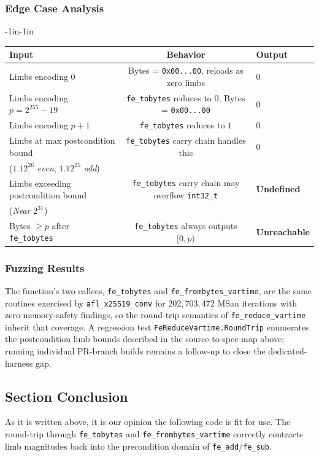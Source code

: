 \documentclass[12pt,titlepage,table]{article}
\begin{document}
\subsubsection{Edge Case Analysis}
\begin{table}[htbp]
\begin{adjustwidth}{-1in}{-1in}
\centering
{
\begin{tabular}{| l | c | l|}
\hline
\textbf{Input} & \textbf{Behavior} & \textbf{Output} \\
\hline
\hline
Limbs encoding $0$ & Bytes = \verb+0x00...00+, reloads as zero limbs & 0 \\
Limbs encoding $p = 2^{255} - 19$ & \verb+fe_tobytes+ reduces to 0, Bytes = \verb+0x00...00+ & 0 \\
Limbs encoding $p+1$ & \verb+fe_tobytes+ reduces to $1$ & 0 \\
Limbs at max postcondition bound & \verb+fe_tobytes+ carry chain handles this & 0 \\
($1.12^{26}$ \textit{even}, $1.12^{25}$ \textit{odd}) &&\\
Limbs exceeding postcondition bound & \verb+fe_tobytes+ carry chain may overflow \verb+int32_t+ & \textbf{Undefined} \\
(\textit{Near} $2^{31}$)&& \\
Bytes $\geq p$ after \verb+fe_tobytes+ & \verb+fe_tobytes+ always outputs $[0, p)$ & \textbf{Unreachable} \\
\hline
\end{tabular}}
\end{adjustwidth}
\end{table}

\subsubsection{Fuzzing Results}
The function's two callees, \verb+fe_tobytes+ and \verb+fe_frombytes_vartime+, are the same routines exercised by \verb+afl_x25519_conv+ for $202{,}703{,}472$ MSan iterations with zero memory-safety findings, so the round-trip semantics of \verb+fe_reduce_vartime+ inherit that coverage. A regression test \verb+FeReduceVartime.RoundTrip+ enumerates the postcondition limb bounds described in the source-to-spec map above; running individual PR-branch builds remains a follow-up to close the dedicated-harness gap.

\subsection[Section Conclusion]{Section Conclusion \hfill \checkmark}
As it is written above, it is our opinion the following code is fit for use.  The round-trip through \verb+fe_tobytes+ and \verb+fe_frombytes_vartime+ correctly contracts limb magnitudes back into the precondition domain of \verb+fe_add+/\verb+fe_sub+.
\end{document}
